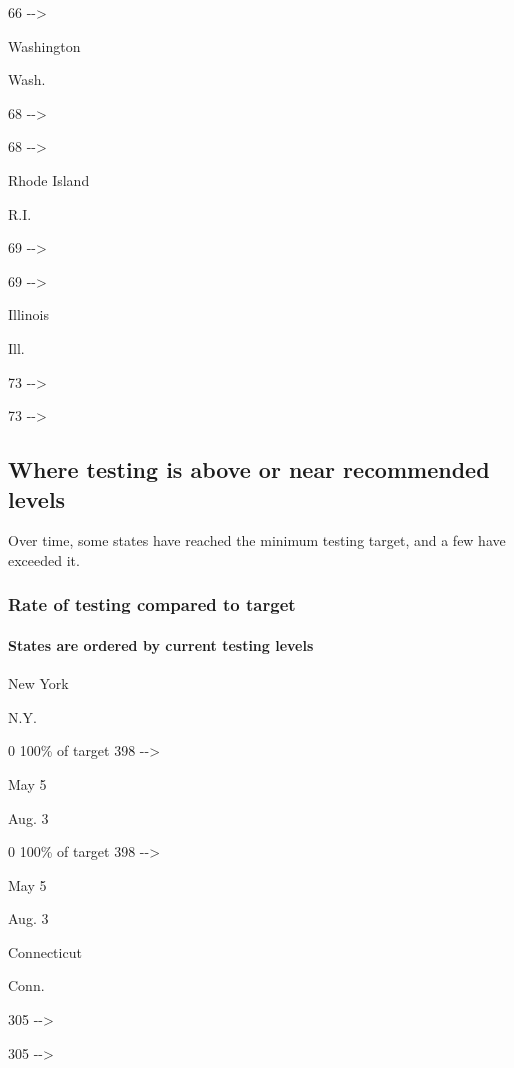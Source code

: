 66 -\/-\textgreater{}

Washington

Wash.

68 -\/-\textgreater{}

68 -\/-\textgreater{}

Rhode Island

R.I.

69 -\/-\textgreater{}

69 -\/-\textgreater{}

Illinois

Ill.

73 -\/-\textgreater{}

73 -\/-\textgreater{}

\hypertarget{where-testing-is-above-or-near-recommended-levels}{%
\subsection{Where testing is above or near recommended
levels}\label{where-testing-is-above-or-near-recommended-levels}}

Over time, some states have reached the minimum testing target, and a
few have exceeded it.

\hypertarget{rate-of-testing-compared-to-target-1}{%
\subsubsection{Rate of testing compared to
target}\label{rate-of-testing-compared-to-target-1}}

\hypertarget{states-are-ordered-by-current-testing-levels}{%
\paragraph{States are ordered by current testing
levels}\label{states-are-ordered-by-current-testing-levels}}

New York

N.Y.

0 100\% of target 398 -\/-\textgreater{}

May 5

Aug. 3

0 100\% of target 398 -\/-\textgreater{}

May 5

Aug. 3

Connecticut

Conn.

305 -\/-\textgreater{}

305 -\/-\textgreater{}

